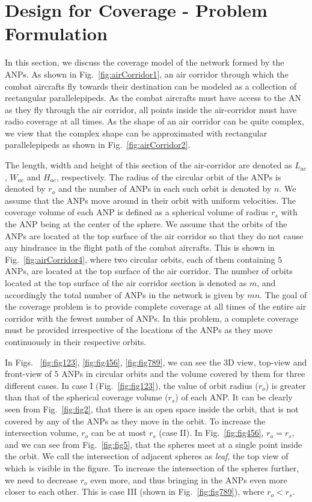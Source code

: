 \documentclass[10pt]{IEEEtran}
\begin{document}
\section{Design for Coverage - Problem Formulation}
\label{sec:coverageProbFormulation}

In this section, we discuss the coverage model of the network formed by the ANPs. As shown in Fig.~\ref{fig:airCorridor1}, an air corridor through which the combat aircrafts fly towards their destination can be modeled as a collection of rectangular parallelepipeds. As the combat aircrafts must have access to the AN as they fly through the air corridor, all points inside the air-corridor must have radio coverage  at all times. As the shape of an air corridor can be quite complex, we view that the complex shape can be approximated with rectangular parallelepipeds as shown in Fig.~\ref{fig:airCorridor2}.

The length, width and height of this section of the air-corridor are denoted as $L_{ac}$, $W_{ac}$ and $H_{ac}$, respectively. The radius of the circular orbit of the ANPs is denoted by  $r_{o}$ and the number of ANPs in each such orbit is denoted by $n$. We assume that the ANPs move around in their orbit with uniform velocities. The coverage volume of each ANP is defined as a spherical volume of radius $r_{s}$ with the ANP being at the center of the sphere. We assume that the orbits of the ANPs are located at the top surface of the air corridor so that they do not cause any  hindrance in the flight path of the combat aircrafts.  This is shown in Fig.~\ref{fig:airCorridor4}, where  two circular orbits, each of them containing $5$ ANPs, are located at the top surface of the air corridor. The number of orbits located at the top surface of the air corridor section is denoted as $m$, and accordingly the total number of ANPs in the network is given by $mn$. The goal of the coverage problem  is to provide complete coverage  at all times of the entire air corridor with the fewest number of ANPs. In this problem, a complete coverage must be provided irrespective of the locations of the ANPs as they move continuously in their respective orbits.

In Figs.~ \ref{fig:fig123}, \ref{fig:fig456}, \ref{fig:fig789}, we can see the 3D view, top-view and front-view of $5$ ANPs in circular orbits and the volume covered by them for three different cases. In case I (Fig.~\ref{fig:fig123}), the value of orbit radius ($r_{o}$) is greater than that of the spherical coverage volume ($r_{s}$) of each ANP. It can be clearly seen from Fig.~\ref{fig:fig2}, that there is an open space inside the orbit, that is not covered by any of the ANPs as they move in the orbit. To increase the intersection volume, $r_{o}$ can be at most $r_{s}$ (case II). In Fig.~\ref{fig:fig456}, $r_{o}=r_{s}$, and we can see from Fig.~\ref{fig:fig5}, that the spheres meet at a single point inside the orbit. We call the intersection of adjacent spheres as {\em leaf}, the top view of which is visible in the figure. To increase the intersection of the spheres further, we need to decrease $r_{o}$ even more, and thus bringing in the ANPs even more closer to each other. This is case III (shown in Fig.~\ref{fig:fig789}), where $r_{o} < r_{s}$.  
\end{document}
